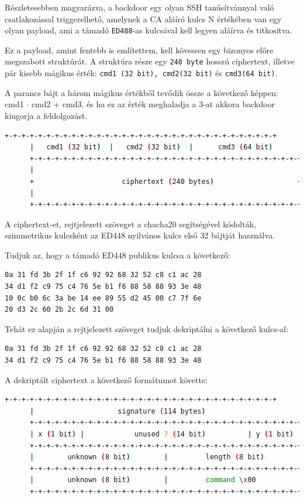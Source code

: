 \documentclass[11pt]{article}
\begin{document}
Részletesebben magyarázva, a backdoor egy olyan SSH tanúsítvánnyal való csatlakozással triggerelhető, amelynek a CA aláíró kulcs N értékében van egy olyan payload, ami a támadó \lstinline{ED488}-as kulcsával kell legyen aláírva és titkosítva.

Ez a payload, amint fentebb is említettem, kell kövessen egy bizonyos előre megszabott struktúrát. A struktúra része egy \lstinline{240 byte} hosszú ciphertext, illetve pár kisebb mágikus érték: \lstinline{cmd1 (32 bit), cmd2(32 bit)} és \lstinline{cmd3(64 bit)}.

A parancs bájt a három mágikus értékből tevődik össze a következő képpen: cmd1 $\cdot$ cmd2 + cmd3, és ha ez az érték meghaladja a 3-at akkora backdoor kiugorja a feldolgozást.
\begin{lstlisting}[language=bash]
      +-+-+-+-+-+-+-+-+-+-+-+-+-+-+-+-+-+-+-+-+-+-+-+-+-+-+-+-+-+-+-+-+
      |   cmd1 (32 bit)  |   cmd2 (32 bit)  |      cmd3 (64 bit)      |
      +-+-+-+-+-+-+-+-+-+-+-+-+-+-+-+-+-+-+-+-+-+-+-+-+-+-+-+-+-+-+-+-+
      |                                                               |
      +                     ciphertext (240 bytes)                    +
      |                                                               |
      +-+-+-+-+-+-+-+-+-+-+-+-+-+-+-+-+-+-+-+-+-+-+-+-+-+-+-+-+-+-+-+-+
\end{lstlisting}

A ciphertext-et, rejtjelezett szöveget a chacha20 segítségével kódolták, szimmetrikus kulcsként az ED448 nyilvános kulcs első 32 bájtját használva.

Tudjuk az, hogy a támadó ED448 publikus kulcsa a következő:
\begin{lstlisting}[language=bash]
0a 31 fd 3b 2f 1f c6 92 92 68 32 52 c8 c1 ac 28
34 d1 f2 c9 75 c4 76 5e b1 f6 88 58 88 93 3e 48
10 0c b0 6c 3a be 14 ee 89 55 d2 45 00 c7 7f 6e
20 d3 2c 60 2b 2c 6d 31 00
\end{lstlisting}

Tehát ez alapján a rejtjelezett szöveget tudjuk dekriptálni a következő kulcs-al:
\begin{lstlisting}[language=bash]
0a 31 fd 3b 2f 1f c6 92 92 68 32 52 c8 c1 ac 28
34 d1 f2 c9 75 c4 76 5e b1 f6 88 58 88 93 3e 48
\end{lstlisting}

A dekriptált ciphertext a következő formátumot követte:
\begin{lstlisting}[language=bash]
      +-+-+-+-+-+-+-+-+-+-+-+-+-+-+-+-+-+-+-+-+-+-+-+-+-+-+-+-+-+-+-+-+
      |                    signature (114 bytes)                      |
      +-+-+-+-+-+-+-+-+-+-+-+-+-+-+-+-+-+-+-+-+-+-+-+-+-+-+-+-+-+-+-+-+
      | x (1 bit) |            unused ? (14 bit)          | y (1 bit) |
      +-+-+-+-+-+-+-+-+-+-+-+-+-+-+-+-+-+-+-+-+-+-+-+-+-+-+-+-+-+-+-+-+
      |        unknown (8 bit)        |         length (8 bit)        |
      +-+-+-+-+-+-+-+-+-+-+-+-+-+-+-+-+-+-+-+-+-+-+-+-+-+-+-+-+-+-+-+-+
      |        unknown (8 bit)        |         command \x00          |
      +-+-+-+-+-+-+-+-+-+-+-+-+-+-+-+-+-+-+-+-+-+-+-+-+-+-+-+-+-+-+-+-+
\end{lstlisting}
\end{document}
